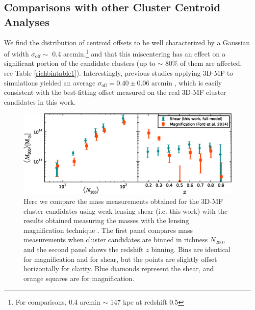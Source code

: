 
\subsection{Comparisons with other Cluster Centroid Analyses}
\label{sec:centers}
We find the distribution of centroid offsets to be well characterized by a Gaussian of width $\sigma_{\mathrm{off}} \sim$ 0.4 arcmin,\footnote[2]{For comparisons, 0.4 arcmin $\sim$ 147 kpc at redshift 0.5} and that this miscentering has an effect on a significant portion of the candidate clusters (up to $\sim$ 80\% of them are affected, see Table \ref{richbintable1}). Interestingly, previous studies applying \ac{3D-MF} to simulations yielded an average $\sigma_{\mathrm{off}}=0.40 \pm 0.06$ arcmin \citep[see Figure 1 in][]{Ford14}, which is easily consistent with the best-fitting offset measured on the real \ac{3D-MF} cluster candidates in this work.

\begin{figure}
\begin{center}
  \includegraphics[scale=0.9]{plots_ch4/shearVSmag_N200_z.eps}
  \caption[Comparison of Magnification and Shear Masses]{Here we compare the mass measurements obtained for the \ac{3D-MF} cluster candidates using weak lensing shear (i.e. this work) with the results obtained measuring the masses with the lensing magnification technique \citep[the $N_{200}$ estimates from that work, ][are used in this plot for the purposes of comparison]{Ford14}. The first panel compares mass measurements when cluster candidates are binned in richness $N_{200}$, and the second panel shows the redshift $z$ binning. Bins are identical for magnification and for shear, but the points are slightly offset horizontally for clarity. Blue diamonds represent the shear, and orange squares are for magnification.}
\label{plot:magshear}
\end{center}
\end{figure}

